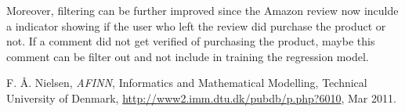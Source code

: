Moreover, filtering can be further improved since the Amazon review now inculde a indicator showing if the user who left the review did purchase the product or not. If a comment did not get verified of purchasing the product, maybe this comment can be filter out and not include in training the regression model.

\begin{thebibliography}{1}
	F. {\AA}. Nielsen, 
	{\em AFINN},
	Informatics and Mathematical Modelling, Technical University of Denmark,
	\url{http://www2.imm.dtu.dk/pubdb/p.php?6010},
	Mar 2011.
\end{thebibliography}
